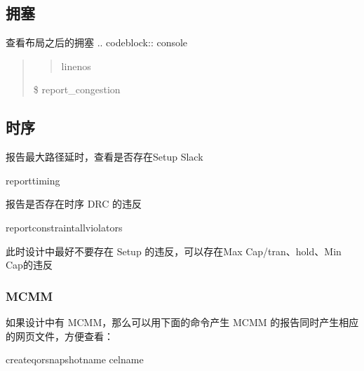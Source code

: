 \documentclass[letterpaper,10pt,english]{sphinxmanual}
\begin{document}
\subsection{拥塞}
\label{\detokenize{chapter6/_u5e03_u5c40_u65b9_u6848_u8bc4_u4f30:id2}}
\sphinxAtStartPar
查看布局之后的拥塞
.. code\sphinxhyphen{}block:: console
\begin{quote}
\begin{quote}\begin{description}
\item[{linenos}] \leavevmode
\end{description}\end{quote}

\sphinxAtStartPar
\$ report\_congestion
\end{quote}


\subsection{时序}
\label{\detokenize{chapter6/_u5e03_u5c40_u65b9_u6848_u8bc4_u4f30:id3}}
\sphinxAtStartPar
报告最大路径延时，查看是否存在Setup Slack

\begin{sphinxVerbatim}[commandchars=\\\{\},numbers=left,firstnumber=1,stepnumber=1]
report\PYGZus{}timing
\end{sphinxVerbatim}

\sphinxAtStartPar
报告是否存在时序 DRC 的违反

\begin{sphinxVerbatim}[commandchars=\\\{\},numbers=left,firstnumber=1,stepnumber=1]
report\PYGZus{}constraint\PYGZhy{}all\PYGZus{}violators
\end{sphinxVerbatim}

\sphinxAtStartPar
此时设计中最好不要存在 Setup 的违反，可以存在Max Cap/tran、hold、Min Cap的违反


\subsubsection{MCMM}
\label{\detokenize{chapter6/_u5e03_u5c40_u65b9_u6848_u8bc4_u4f30:mcmm}}
\sphinxAtStartPar
如果设计中有 MCMM，那么可以用下面的命令产生 MCMM 的报告同时产生相应的网页文件，方便查看：

\begin{sphinxVerbatim}[commandchars=\\\{\},numbers=left,firstnumber=1,stepnumber=1]
create\PYGZus{}qor\PYGZus{}snapshot\PYGZhy{}name cel\PYGZus{}name
\end{sphinxVerbatim}
\end{document}
